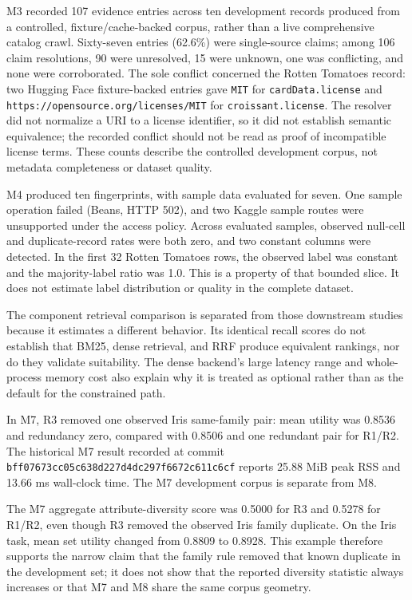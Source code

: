 \documentclass[conference]{IEEEtran}
\begin{document}
M3 recorded 107 evidence entries across ten development records produced from a controlled, fixture/cache-backed corpus, rather than a live comprehensive catalog crawl. Sixty-seven entries (62.6\%) were single-source claims; among 106 claim resolutions, 90 were unresolved, 15 were unknown, one was conflicting, and none were corroborated. The sole conflict concerned the Rotten Tomatoes record: two Hugging Face fixture-backed entries gave \texttt{MIT} for \texttt{cardData.license} and \texttt{https://opensource.org/licenses/MIT} for \texttt{croissant.license}. The resolver did not normalize a URI to a license identifier, so it did not establish semantic equivalence; the recorded conflict should not be read as proof of incompatible license terms. These counts describe the controlled development corpus, not metadata completeness or dataset quality.

M4 produced ten fingerprints, with sample data evaluated for seven. One sample operation failed (Beans, HTTP 502), and two Kaggle sample routes were unsupported under the access policy. Across evaluated samples, observed null-cell and duplicate-record rates were both zero, and two constant columns were detected. In the first 32 Rotten Tomatoes rows, the observed label was constant and the majority-label ratio was 1.0. This is a property of that bounded slice. It does not estimate label distribution or quality in the complete dataset.

The component retrieval comparison is separated from those downstream studies because it estimates a different behavior. Its identical recall scores do not establish that BM25, dense retrieval, and RRF produce equivalent rankings, nor do they validate suitability. The dense backend's large latency range and whole-process memory cost also explain why it is treated as optional rather than as the default for the constrained path.

In M7, R3 removed one observed Iris same-family pair: mean utility was 0.8536 and redundancy zero, compared with 0.8506 and one redundant pair for R1/R2. The historical M7 result recorded at commit \texttt{bff07673cc05c638d227d4dc297f6672c611c6cf} reports 25.88 MiB peak RSS and 13.66 ms wall-clock time. The M7 development corpus is separate from M8.

The M7 aggregate attribute-diversity score was 0.5000 for R3 and 0.5278 for R1/R2, even though R3 removed the observed Iris family duplicate. On the Iris task, mean set utility changed from 0.8809 to 0.8928. This example therefore supports the narrow claim that the family rule removed that known duplicate in the development set; it does not show that the reported diversity statistic always increases or that M7 and M8 share the same corpus geometry.
\end{document}
